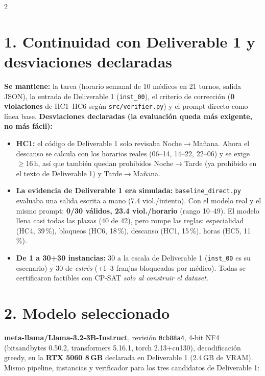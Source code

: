 \documentclass[9pt,a4paper]{extarticle}
\begin{document}
\raggedcolumns
\begin{multicols}{2}

\section{1. Continuidad con Deliverable 1 y desviaciones declaradas}
\textbf{Se mantiene:} la tarea (horario semanal de 10 médicos en 21 turnos, salida JSON), la entrada de Deliverable 1 (\texttt{inst\_00}), el criterio de corrección (\textbf{0 violaciones} de HC1--HC6 según \texttt{src/verifier.py}) y el prompt directo como línea base.
\textbf{Desviaciones declaradas (la evaluación queda más exigente, no más fácil):}
\begin{itemize}[label=$\blacktriangleright$]
    \item \textbf{HC1:} el código de Deliverable 1 solo revisaba Noche$\to$Mañana. Ahora el descanso se calcula con los horarios reales (06--14, 14--22, 22--06) y se exige $\ge$16\,h, así que también quedan prohibidos Noche$\to$Tarde (ya prohibido en el texto de Deliverable 1) y Tarde$\to$Mañana.
    \item \textbf{La evidencia de Deliverable 1 era simulada:} \texttt{baseline\_direct.py} evaluaba una salida escrita a mano (7.4 viol./intento). Con el modelo real y el mismo prompt: \textbf{0/30 válidos, 23.4 viol./horario} (rango 10--49). El modelo llena casi todas las plazas (40 de 42), pero rompe las reglas: especialidad (HC4, 39\,\%), bloqueos (HC6, 18\,\%), descanso (HC1, 15\,\%), horas (HC5, 11\,\%).
    \item \textbf{De 1 a 30+30 instancias:} 30 a la escala de Deliverable 1 (\texttt{inst\_00} es su escenario) y 30 de \emph{estrés} (+1--3 franjas bloqueadas por médico). Todas se certificaron factibles con CP-SAT \emph{solo al construir el dataset}.
\end{itemize}

\section{2. Modelo seleccionado}
\textbf{meta-llama/Llama-3.2-3B-Instruct}, revisión \texttt{0cb88a4}, 4-bit NF4 (bitsandbytes 0.50.2, transformers 5.16.1, torch 2.13+cu130), decodificación greedy, en la \textbf{RTX 5060 8\,GB} declarada en Deliverable 1 (2.4\,GB de VRAM). Mismo pipeline, instancias y verificador para los tres candidatos de Deliverable 1:


\end{multicols}
\end{document}
